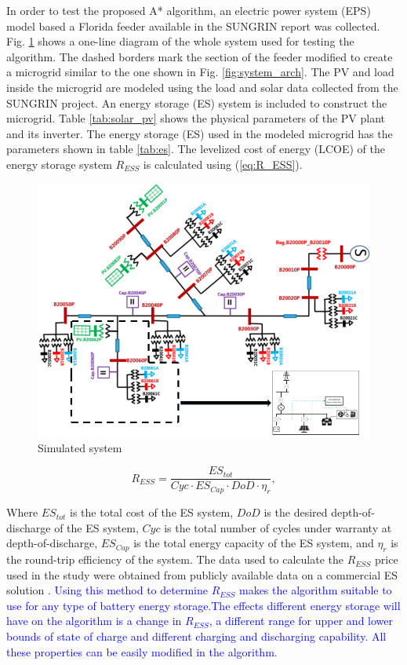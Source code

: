 In order to test the proposed A* algorithm, an electric power system (EPS) model based a Florida feeder available in the SUNGRIN report \cite{SUNGRIN} was collected. Fig. \ref{fig:simulation_grid} shows a one-line diagram of the whole system used for testing the algorithm. The dashed borders mark the section of the feeder modified to create a microgrid similar to the one shown in Fig. \ref{fig:system_arch}. The PV and load inside the microgrid are modeled using the load and solar data collected from the SUNGRIN project. An energy storage (ES) system is included to construct the microgrid. Table \ref{tab:solar_pv} shows the physical parameters of the PV plant and its inverter. The energy storage (ES) used in the modeled microgrid has the parameters shown in table \ref{tab:es}. The levelized cost of energy (LCOE)  of the energy storage system $R_{ESS}$ is calculated using (\ref{eq:R_ESS}).

\begin{figure}[!ht]
    \centering
    \includegraphics[width = 0.8\linewidth]{figs/simulation_grid.png}
    \caption{Simulated system}
    \label{fig:simulation_grid}
\end{figure}


\begin{equation}
\label{eq:R_ESS}
R_{ESS} = \dfrac{ES_{tot}}{Cyc\cdot ES_{Cap}\cdot DoD\cdot \eta_{r}},
\end{equation}

Where $ES_{tot}$ is the total cost of the ES system, $DoD$ is the desired depth-of-discharge of the ES system, $Cyc$ is the total number of cycles under warranty at depth-of-discharge, $ES_{Cap}$ is the total energy capacity of the ES system, and $\eta_r$ is the round-trip efficiency of the system. The data used to calculate the $R_{ESS}$ price used in the study were obtained from publicly available data on a commercial ES solution \cite{tesla_powerpack_2018}. \textcolor{blue}{Using this method to determine $R_{ESS}$ makes the algorithm suitable to use for any type of battery energy storage.The effects different energy storage will have on the algorithm is a change in $R_{ESS}$, a different range for upper and lower bounds of state of charge and different charging and discharging capability. All these properties can be easily modified in the algorithm.}

